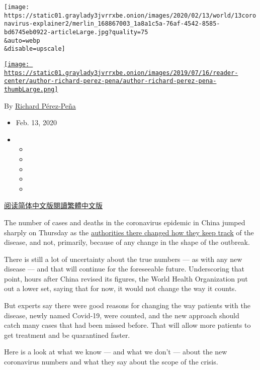 \texttt{[image: https://static01.graylady3jvrrxbe.onion/images/2020/02/13/world/13coronavirus-explainer2/merlin\_168867003\_1a8a1c5a-76af-4542-8585-bd6745eb0922-articleLarge.jpg?quality=75\\\&auto=webp\\\&disable=upscale]}

\href{https://www.nytimes3xbfgragh.onion/by/richard-perez-pena}{\texttt{[image: https://static01.graylady3jvrrxbe.onion/images/2019/07/16/reader-center/author-richard-perez-pena/author-richard-perez-pena-thumbLarge.png]}}

By
\href{https://www.nytimes3xbfgragh.onion/by/richard-perez-pena}{Richard
Pérez-Peña}

\begin{itemize}
\item
  Feb. 13, 2020
\item
  \begin{itemize}
  \item
  \item
  \item
  \item
  \item
  \end{itemize}
\end{itemize}

\href{https://cn.nytimes3xbfgragh.onion/china/20200214/coronavirus-numbers-explain/}{阅读简体中文版}\href{https://cn.nytimes3xbfgragh.onion/china/20200214/coronavirus-numbers-explain/zh-hant/}{閱讀繁體中文版}

The number of cases and deaths in the coronavirus epidemic in China
jumped sharply on Thursday as the
\href{https://www.nytimes3xbfgragh.onion/2020/02/12/health/coronavirus-cases-china.html}{authorities
there changed how they keep track} of the disease, and not, primarily,
because of any change in the shape of the outbreak.

There is still a lot of uncertainty about the true numbers --- as with
any new disease --- and that will continue for the foreseeable future.
Underscoring that point, hours after China revised its figures, the
World Health Organization put out a lower set, saying that for now, it
would not change the way it counts.

But experts say there were good reasons for changing the way patients
with the disease, newly named Covid-19, were counted, and the new
approach should catch many cases that had been missed before. That will
allow more patients to get treatment and be quarantined faster.

Here is a look at what we know --- and what we don't --- about the new
coronavirus numbers and what they say about the scope of the crisis.

